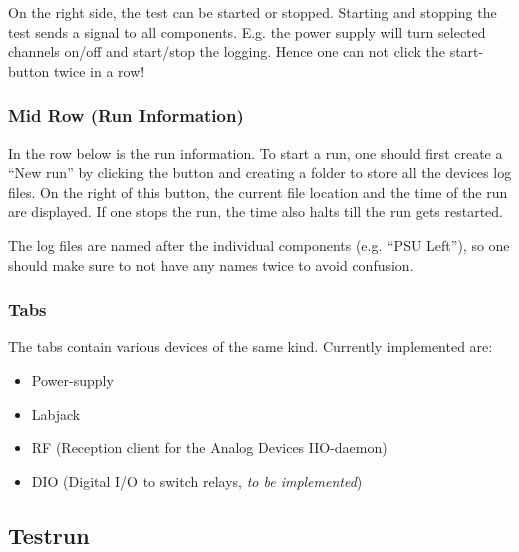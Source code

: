 \documentclass[10pt,a4paper]{article}
\begin{document}
	\bigbreak
	
	On the right side, the test can be started or stopped. Starting and stopping the test sends a signal to all components. E.g. the power supply will turn selected channels on/off and start/stop the logging. Hence one can not click the start-button twice in a row!
	
	\subsubsection{Mid Row (Run Information)}
	
	In the row below is the run information. To start a run, one should first create a \enquote{New run} by clicking the button and creating a folder to store all the devices log files. On the right of this button, the current file location and the time of the run are displayed. If one stops the run, the time also halts till the run gets restarted. 

	\bigbreak	
	
	The log files are named after the individual components (e.g. \enquote{PSU Left}), so one should make sure to not have any names twice to avoid confusion.
	
	\subsubsection{Tabs}
	
	The tabs contain various devices of the same kind. Currently implemented are:
	
	\begin{itemize}
\item Power-supply
\item Labjack
\item RF (Reception client for the Analog Devices IIO-daemon)
\item DIO (Digital I/O to switch relays, \textit{to be implemented})
	\end{itemize}		
	
	\subsection{Testrun}	
	
\end{document}
